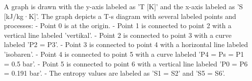 A graph is drawn with the y-axis labeled as 'T [K]' and the x-axis labeled as 'S [kJ/kg·K]'. The graph depicts a T-s diagram with several labeled points and processes:  
- Point 0 is at the origin.  
- Point 1 is connected to point 2 with a vertical line labeled 'vertikal'.  
- Point 2 is connected to point 3 with a curve labeled 'P2 = P3'.  
- Point 3 is connected to point 4 with a horizontal line labeled 'isobaren'.  
- Point 4 is connected to point 5 with a curve labeled 'P4 = Ps = P1 = 0.5 bar'.  
- Point 5 is connected to point 6 with a vertical line labeled 'P0 = P6 = 0.191 bar'.  
- The entropy values are labeled as 'S1 = S2' and 'S5 = S6'.